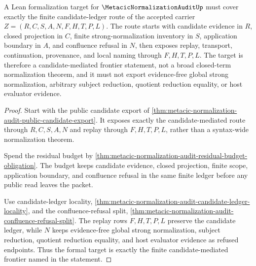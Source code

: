 \begin{theorem}
\label{thm:metacic-normalization-audit-frontier-formal-target}
A Lean formalization target for $\MetacicNormalizationAuditUp$ must cover exactly the finite candidate-ledger route of the accepted carrier $Z=(R,C,S,A,N,F,H,T,P,L)$. The route starts with candidate evidence in $R$, closed projection in $C$, finite strong-normalization inventory in $S$, application boundary in $A$, and confluence refusal in $N$, then exposes replay, transport, continuation, provenance, and local naming through $F,H,T,P,L$. The target is therefore a candidate-mediated frontier statement, not a broad closed-term normalization theorem, and it must not export evidence-free global strong normalization, arbitrary subject reduction, quotient reduction equality, or host evaluator evidence.
\end{theorem}
\begin{proof}
Start with the public candidate export of \autoref{thm:metacic-normalization-audit-public-candidate-export}. It exposes exactly the candidate-mediated route through $R,C,S,A,N$ and replay through $F,H,T,P,L$, rather than a syntax-wide normalization theorem.

Spend the residual budget by \autoref{thm:metacic-normalization-audit-residual-budget-obligation}. The budget keeps candidate evidence, closed projection, finite scope, application boundary, and confluence refusal in the same finite ledger before any public read leaves the packet.

Use candidate-ledger locality, \autoref{thm:metacic-normalization-audit-candidate-ledger-locality}, and the confluence-refusal split, \autoref{thm:metacic-normalization-audit-confluence-refusal-split}. The replay rows $F,H,T,P,L$ preserve the candidate ledger, while $N$ keeps evidence-free global strong normalization, subject reduction, quotient reduction equality, and host evaluator evidence as refused endpoints. Thus the formal target is exactly the finite candidate-mediated frontier named in the statement.
\end{proof}


